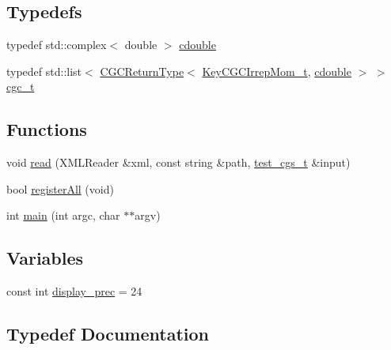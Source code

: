 \subsection*{Typedefs}
\begin{DoxyCompactItemize}
\item 
typedef std\+::complex$<$ double $>$ \mbox{\hyperlink{adat-devel_2main_2irreputils_2cgs__table__hardcode_8cc_a5f9966666d076841002cd443622b7ccd}{cdouble}}
\item 
typedef std\+::list$<$ \mbox{\hyperlink{structHadron_1_1CGCReturnType}{C\+G\+C\+Return\+Type}}$<$ \mbox{\hyperlink{structHadron_1_1KeyCGCIrrepMom__t}{Key\+C\+G\+C\+Irrep\+Mom\+\_\+t}}, \mbox{\hyperlink{namespaceHadron_1_1CGC_a52d2b70e6792726fb525eab94daae53b}{cdouble}} $>$ $>$ \mbox{\hyperlink{adat-devel_2main_2irreputils_2cgs__table__hardcode_8cc_a3c0cc566063b4e9f9351ef99884395b3}{cgc\+\_\+t}}
\end{DoxyCompactItemize}
\subsection*{Functions}
\begin{DoxyCompactItemize}
\item 
void \mbox{\hyperlink{adat-devel_2main_2irreputils_2cgs__table__hardcode_8cc_a0bc6eab6ee4938b14f32a0a933d96dd9}{read}} (X\+M\+L\+Reader \&xml, const string \&path, \mbox{\hyperlink{structtest__cgs__t}{test\+\_\+cgs\+\_\+t}} \&input)
\item 
bool \mbox{\hyperlink{adat-devel_2main_2irreputils_2cgs__table__hardcode_8cc_a3872416cf70cb24d7da1008a3f3b1d96}{register\+All}} (void)
\item 
int \mbox{\hyperlink{adat-devel_2main_2irreputils_2cgs__table__hardcode_8cc_a3c04138a5bfe5d72780bb7e82a18e627}{main}} (int argc, char $\ast$$\ast$argv)
\end{DoxyCompactItemize}
\subsection*{Variables}
\begin{DoxyCompactItemize}
\item 
const int \mbox{\hyperlink{adat-devel_2main_2irreputils_2cgs__table__hardcode_8cc_a473744fa8268c6d49feba30498a6cace}{display\+\_\+prec}} = 24
\end{DoxyCompactItemize}


\subsection{Typedef Documentation}
\mbox{\label{adat-devel_2main_2irreputils_2cgs__table__hardcode_8cc_a5f9966666d076841002cd443622b7ccd}} 
